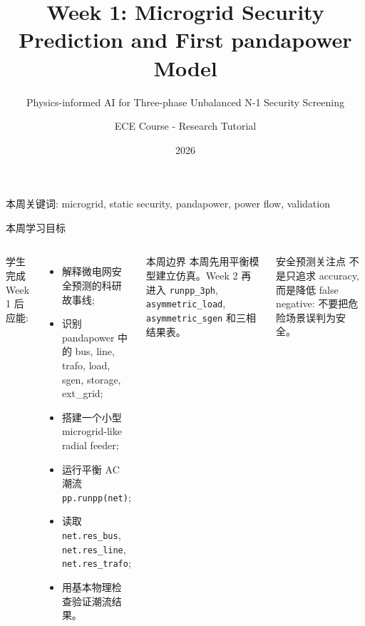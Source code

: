 \documentclass[aspectratio=169,10pt]{ctexbeamer}
\title[Week 1: Microgrid + pandapower]{Week 1: Microgrid Security Prediction and First pandapower Model}
\subtitle{Physics-informed AI for Three-phase Unbalanced N-1 Security Screening}
\author{ECE Course - Research Tutorial}
\institute{Microgrid 3-phase Security AI Project}
\date{2026}
\newcommand{\code}[1]{\texttt{#1}}
\begin{document}
\begin{frame}
  \titlepage
  \vspace{-0.8em}
  \begin{center}
    \small 本周关键词: microgrid, static security, pandapower, power flow, validation
  \end{center}
\end{frame}

\begin{frame}{本周学习目标}
\begin{columns}[T]
学生完成 Week 1 后应能:
\begin{itemize}
  \item 解释微电网安全预测的科研故事线;
  \item 识别 pandapower 中的 bus, line, trafo, load, sgen, storage, ext\_grid;
  \item 搭建一个小型 microgrid-like radial feeder;
  \item 运行平衡 AC 潮流 \code{pp.runpp(net)};
  \item 读取 \code{net.res\_bus}, \code{net.res\_line}, \code{net.res\_trafo};
  \item 用基本物理检查验证潮流结果。
\end{itemize}
\begin{block}{本周边界}
本周先用平衡模型建立仿真。Week 2 再进入 \code{runpp\_3ph}, \code{asymmetric\_load}, \code{asymmetric\_sgen} 和三相结果表。
\end{block}
\begin{alertblock}{安全预测关注点}
不是只追求 accuracy, 而是降低 false negative: 不要把危险场景误判为安全。
\end{alertblock}
\end{columns}
\end{frame}
\end{document}
